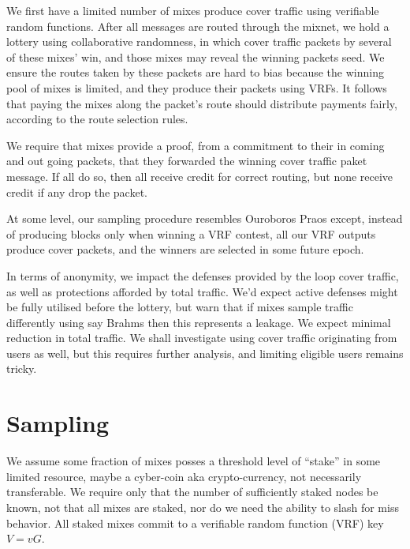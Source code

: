 ﻿\documentclass{sig-alternate-hotpets}
\begin{document}
We first have a limited number of mixes produce cover traffic using verifiable random functions.  
After all messages are routed through the mixnet, we hold a lottery using collaborative randomness, in which cover traffic packets by several of these mixes’ win, and those mixes may reveal the winning packets seed.  
We ensure the routes taken by these packets are hard to bias because the winning pool of mixes is limited, and they produce their packets using VRFs.  
It follows that paying the mixes along the packet’s route should distribute payments fairly, according to the route selection rules. 

We require that mixes provide a proof, from a commitment to their in coming and out going packets, that they forwarded the winning cover traffic paket message.  
If all do so, then all receive credit for correct routing, but none receive credit if any drop the packet.

At some level, our sampling procedure resembles Ouroboros Praos \cite{OuroborosPraos} except, instead of producing blocks only when winning a VRF contest, all our VRF outputs produce cover packets, and the winners are selected in some future epoch.  

In terms of anonymity, we impact the defenses provided by the loop cover traffic, as well as protections afforded by total traffic.  We’d expect active defenses might be fully utilised before the lottery, but warn that if mixes sample traffic differently using say Brahms then this represents a leakage.  We expect minimal reduction in total traffic.  We shall investigate using cover traffic originating from users as well, but this requires further analysis, and limiting eligible users remains tricky.

\section{Sampling} %

We assume some fraction of mixes posses a threshold level of ``stake'' in some limited resource, maybe a cyber-coin aka crypto-currency, not necessarily transferable.  We require only that the number of sufficiently staked nodes be known, not that all mixes are staked, nor do we need the ability to slash for miss behavior.  All staked mixes commit to a verifiable random function (VRF) key $V = v G$.  
\end{document}
